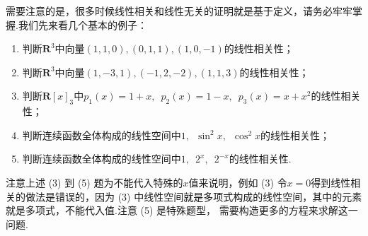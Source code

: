 需要注意的是，很多时候线性相关和线性无关的证明就是基于定义，请务必牢牢掌握.我们先来看几个基本的例子：
\begin{example}
    \begin{enumerate}[label=(\arabic*)]
        \item 判断$\mathbf{R}^3$中向量$(1,1,0),(0,1,1),(1,0,-1)$的线性相关性；

        \item 判断$\mathbf{R}^3$中向量$(1,-3,1),(-1,2,-2),(1,1,3)$的线性相关性；

        \item 判断$\mathbf{R}[x]_3$中$p_1(x)=1+x,\enspace p_2(x)=1-x,\enspace p_3(x)=x+x^2$的线性相关性；

        \item 判断连续函数全体构成的线性空间中$1,\enspace \sin^2x,\enspace \cos^2x$的线性相关性；

        \item 判断连续函数全体构成的线性空间中$1,\enspace 2^x,\enspace 2^{-x}$的线性相关性.
    \end{enumerate}
\end{example}
注意上述 (3) 到 (5) 题为不能代入特殊的$x$值来说明，例如 (3) 令$x=0$得到线性相关的做法是错误的，因为
(3) 中线性空间就是多项式构成的线性空间，其中的元素就是多项式，不能代入值.注意 (5) 是特殊题型，
需要构造更多的方程来求解这一问题.

